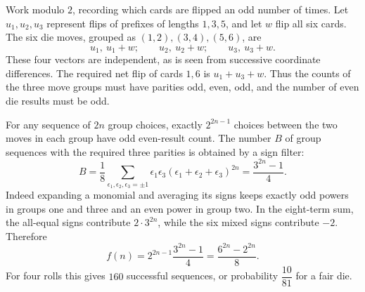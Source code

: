 Work modulo $2$, recording which cards are flipped an odd number of times. Let $u_1,u_2,u_3$ represent flips of prefixes of lengths $1,3,5$, and let $w$ flip all six cards. The six die moves, grouped as $(1,2),(3,4),(5,6)$, are
\[
u_1,\ u_1+w;\qquad u_2,\ u_2+w;\qquad u_3,\ u_3+w.
\]
These four vectors are independent, as is seen from successive coordinate differences. The required net flip of cards $1,6$ is $u_1+u_3+w$. Thus the counts of the three move groups must have parities odd, even, odd, and the number of even die results must be odd.

For any sequence of $2n$ group choices, exactly $2^{2n-1}$ choices between the two moves in each group have odd even-result count. The number $B$ of group sequences with the required three parities is obtained by a sign filter:
\[
B=\dfrac{1}{8}\sum_{\epsilon_1,\epsilon_2,\epsilon_3=\pm1}
\epsilon_1\epsilon_3(\epsilon_1+\epsilon_2+\epsilon_3)^{2n}
=\dfrac{3^{2n}-1}{4}.
\]
Indeed expanding a monomial and averaging its signs keeps exactly odd powers in groups one and three and an even power in group two. In the eight-term sum, the all-equal signs contribute $2\cdot3^{2n}$, while the six mixed signs contribute $-2$.
Therefore
\[
\boxed{f(n)=2^{2n-1}\dfrac{3^{2n}-1}{4}
=\dfrac{6^{2n}-2^{2n}}{8}}.
\]
For four rolls this gives $160$ successful sequences, or probability $\dfrac{10}{81}$ for a fair die.
